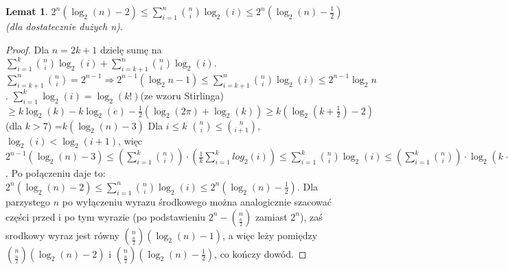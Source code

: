 \documentclass{pracamgr}
\newtheorem{lemma}[theorem]{Lemat}
\begin{document}
   \begin{lemma}\label{sum of log}
    $2^n(\log_2(n)-2)\le\sum_{i=1}^{n}{n\choose i}\log_2(i)\le 2^n(\log_2(n)-\frac{1}{2})$ (dla dostatecznie dużych n).
   \end{lemma}    
   \begin{proof}
    Dla $n=2k+1$ dzielę sumę na $\sum_{i=1}^{k}{n\choose i}\log_2(i)+\sum_{i=k+1}^{n}{n\choose i}\log_2(i)$.\newline
    $\sum_{i=k+1}^{n}{n\choose i}=2^{n-1}\Rightarrow 2^{n-1}(\log_2{n}-1)\le\sum_{i=k+1}^{n}{n\choose i}\log_2(i)\le2^{n-1}\log_2{n}$.\newline
    $\sum_{i=1}^{k}\log_2(i)=\log_2(k!)$(ze wzoru Stirlinga) $\ge k\log_2(k)-k\log_2(e)-\frac{1}{2}(\log_2(2\pi)+\log_2(k))
    \ge k(\log_2(k+\frac{1}{2})-2)$ (dla $k>7$) =$k(\log_2(n)-3)$\newline
    Dla $i\le k$ ${n\choose i}\le{n\choose i+1}$, $\log_2(i)<\log_2(i+1)$, więc
    $2^{n-1}(\log_2(n)-3)\le(\sum_{i=1}^{k}{n\choose i})\cdot(\frac{1}{k}\sum_{i=1}^{k}log_2(i))\le\sum_{i=1}^{k}{n\choose i}\log_2(i)
    \le(\sum_{i=1}^{k}{n\choose i})\cdot\log_2(k+\frac{1}{2})=2^{n-1}(\log_2(n)-1)$. Po połączeniu daje to:\newline
    $2^n(\log_2(n)-2)\le\sum_{i=1}^{n}{n\choose i}\log_2(i)\le2^n(\log_2(n)-\frac{1}{2})$.\newline
    Dla parzystego $n$ po wyłączeniu wyrazu środkowego można analogicznie szacować części przed i po tym wyrazie
    (po podstawieniu $2^n-{n\choose \frac{n}{2}}$ zamiast $2^n$), zaś srodkowy wyraz jest równy ${n\choose \frac{n}{2}}(\log_2(n)-1)$, a więc leży pomiędzy
    ${n\choose \frac{n}{2}}(\log_2(n)-2)$ i ${n\choose \frac{n}{2}}(\log_2(n)-\frac{1}{2})$, co kończy dowód.
   \end{proof}
\end{document}
